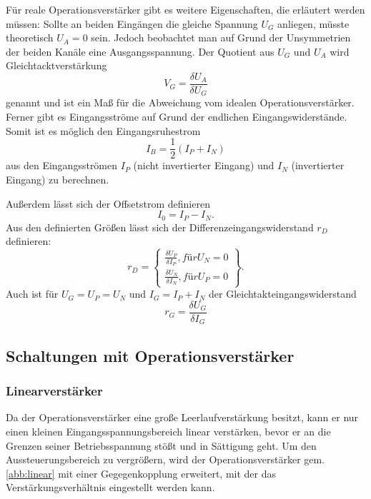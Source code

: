 Für reale Operationsverstärker gibt es weitere Eigenschaften, die erläutert werden müssen:
Sollte an beiden Eingängen die gleiche Spannung $U_G$ anliegen, müsste theoretisch $U_A = 0$ sein. Jedoch beobachtet man auf Grund der Unsymmetrien der beiden Kanäle eine Ausgangsspannung.
Der Quotient aus $U_G$ und $U_A$ wird Gleichtacktverstärkung
\begin{equation}
V_G = \frac{\delta U_A}{\delta U_G}
\end{equation}
genannt und ist ein Maß für die Abweichung vom idealen Operationsverstärker.
Ferner gibt es Eingangsströme auf Grund der endlichen Eingangswiderstände. Somit ist es möglich den Eingangsruhestrom
\begin{equation}
I_B = \frac{1}{2} (I_P + I_N)
\end{equation}
aus den Eingangsströmen $I_P$ (nicht invertierter Eingang) und $I_N$ (invertierter Eingang) zu berechnen.

Außerdem lässt sich der Offsetstrom definieren
\begin{equation}
I_0 = I_P - I_N.
\end{equation}
Aus den definierten Größen lässt sich der Differenzeingangswiderstand $r_D$ definieren:
\begin{equation}
r_D = \left\{\begin{array}{ll} \frac{\delta U_P}{\delta I_P}, für U_N = 0\\
	  \frac{\delta U_N}{\delta I_N}, für U_P = 0\end{array}\right\}.
\end{equation}
Auch ist für $U_G = U_P = U_N$ und $I_G = I_P + I_N$ der Gleichtakteingangswiderstand
\begin{equation}
r_G = \frac{\delta U_G}{\delta I_G}
\end{equation}

\subsection{Schaltungen mit Operationsverst{\"a}rker}

\subsubsection{Linearverst{\"a}rker}
Da der Operationsverstärker eine große Leerlaufverstärkung besitzt, kann  er nur einen kleinen Eingangsspannungsbereich linear verstärken, bevor er an die Grenzen  seiner Betriebsspannung stößt und in Sättigung geht. Um den Aussteuerungsbereich zu vergrößern, wird der Operationsverstärker gem. \ref{abb:linear} mit einer Gegegenkopplung erweitert, mit der das Verstärkungsverhältnis eingestellt werden kann.

